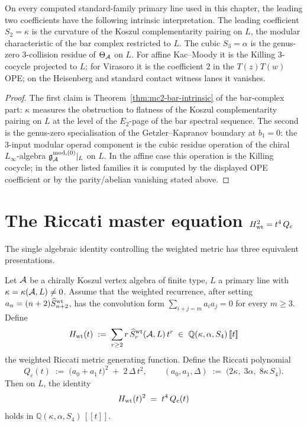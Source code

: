 \begin{proposition}
\label{prop:s2-s3-roles}
\ClaimStatusConditional
On every computed standard-family primary line used in this chapter,
the leading two coefficients have the following intrinsic
interpretation. The leading coefficient $S_2 = \kappa$ is the curvature
of the Koszul complementarity pairing on $L$, the modular
characteristic of the bar complex restricted to $L$. The cubic
$S_3 = \alpha$ is the genus-zero $3$-collision residue of
$\Theta_{\mathcal{A}}$ on $L$. For affine Kac--Moody it is the Killing
$3$-cocycle projected to $L$; for Virasoro it is the coefficient
$2$ in the $T(z)T(w)$ OPE; on the Heisenberg and standard contact
witness lanes it vanishes.
\end{proposition}

\begin{proof}
The first claim is Theorem~\ref{thm:mc2-bar-intrinsic} of the
bar-complex part: $\kappa$ measures the obstruction to flatness of
the Koszul complementarity pairing on $L$ at the level of the
$E_2$-page of the bar spectral sequence. The second is the genus-zero
specialisation of the Getzler--Kapranov boundary at $b_1 = 0$: the
$3$-input modular operad component is the cubic residue operation of
the chiral $L_\infty$-algebra
$\mathfrak g^{\rm mod, (0)}_{\mathcal{A}}|_L$ on $L$. In the affine case this
operation is the Killing cocycle; in the other listed families it is
computed by the displayed OPE coefficient or by the parity/abelian
vanishing stated above.
\end{proof}

\section{The Riccati master equation $H_{\rm wt}^{2} = t^{4}\,Q_c$}
\label{sec:riccati-master-equation}

The single algebraic identity controlling the weighted metric has
three equivalent presentations.

\begin{theorem}
\label{thm:riccati-master}
\ClaimStatusConditional
Let $\mathcal{A}$ be a chirally Koszul vertex algebra of finite type, $L$ a
primary line with $\kappa = \kappa(\mathcal{A}, L) \neq 0$.  Assume that the
weighted recurrence, after setting
$a_n=(n+2)\widehat S^{\rm wt}_{n+2}$, has the convolution form
$\sum_{i+j=m}a_i a_j=0$ for every $m\ge3$.  Define
\[
H_{\rm wt}(t) \;:=\; \sum_{r\ge 2} r\,\widehat S^{\rm wt}_r(\mathcal{A}, L)\,t^{r}
\;\in\; \mathbb Q(\kappa, \alpha, S_4)\,[\![t]\!]
\]
the weighted Riccati metric generating function. Define the Riccati
polynomial
\[
Q_c(t) \;:=\; \bigl(a_0 + a_1\,t\bigr)^{2}
\;+\; 2\,\Delta\,t^{2},
\qquad
(a_0, a_1, \Delta) \;:=\; \bigl(2\kappa,\;3\alpha,\;8\kappa\,S_4\bigr).
\]
Then on $L$, the identity
\begin{equation}
\label{eq:riccati-master}
H_{\rm wt}(t)^{2} \;=\; t^{4}\,Q_c(t)
\end{equation}
holds in $\mathbb Q(\kappa, \alpha, S_4)\,[\![t]\!]$.
\end{theorem}

